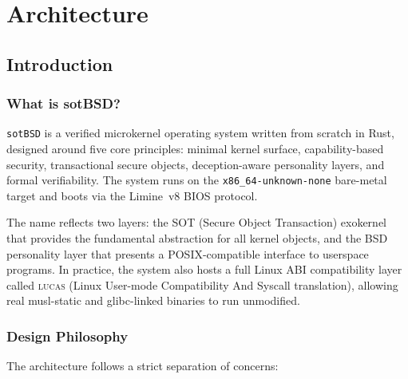 \documentclass[11pt,a4paper,twoside]{report}
\theoremstyle{definition}
\newcommand{\sotBSD}{\texttt{sotBSD}}
\newcommand{\LUCAS}{\textsc{lucas}}
\begin{document}
\part{Architecture}

\chapter{Introduction}
\label{ch:intro}

\section{What is sotBSD?}

\sotBSD{} is a verified microkernel operating system written from scratch in
Rust, designed around five core principles: minimal kernel surface, capability-based
security, transactional secure objects, deception-aware personality layers, and
formal verifiability. The system runs on the \texttt{x86\_64-unknown-none}
bare-metal target and boots via the Limine~v8 BIOS protocol.

The name reflects two layers: the SOT (Secure Object Transaction) exokernel
that provides the fundamental abstraction for all kernel objects, and the BSD
personality layer that presents a POSIX-compatible interface to userspace
programs. In practice, the system also hosts a full Linux ABI compatibility
layer called \LUCAS{} (Linux User-mode Compatibility And Syscall translation),
allowing real musl-static and glibc-linked binaries to run unmodified.

\section{Design Philosophy}

The architecture follows a strict separation of concerns:
\end{document}

